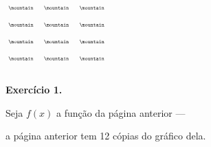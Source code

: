 \documentclass[oneside,12pt]{article}
\begin{document}
\ssk


%                                                

%
\pu

\unitlength=8pt

\vspace*{-0.25cm}
\hspace*{-0.5cm}
$\scalebox{0.55}{$
 \begin{array}{ccccc}
 \mountain && \mountain && \mountain \\[20pt]
 \mountain && \mountain && \mountain \\[20pt]
 \mountain && \mountain && \mountain \\[20pt]
 \mountain && \mountain && \mountain \\[20pt]
 \end{array}
 $}
$


\newpage

%                                             

{\bf Exercício 1.}

Seja $f(x)$ a função da página anterior ---

a página anterior tem 12 cópias do gráfico dela.
\end{document}
